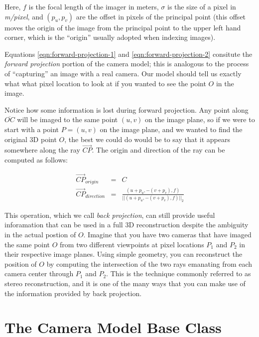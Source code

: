 Here, $f$ is the focal length of the imager in meters, $\sigma$ is the
size of a pixel in {\em m/pixel}, and $(p_u, p_v)$ are the offset in
pixels of the principal point (this offset moves the origin of the
image from the principal point to the upper left hand corner, which is
the ``origin'' usually adopted when indexing images).  

Equations \ref{eqn:forward-projection-1} and
\ref{eqn:forward-projection-2} consitute the {\em forward projection}
portion of the camera model; this is analogous to the process of
``capturing'' an image with a real camera.  Our model should tell us
exactly what what pixel location to look at if you wanted to see the
point $O$ in the image.

Notice how some information is lost during forward projection.  Any
point along $\overline{OC}$ will be imaged to the same point $(u,v)$
on the image plane, so if we were to start with a point $P=(u,v)$ on
the image plane, and we wanted to find the original 3D point $O$, the
best we could do would be to say that it appears somewhere along the
ray $\overrightarrow{CP}$. The
origin and direction of the ray can be computed as follows:

\begin{eqnarray}
\label{eqn:reverse-projection-1}
\overrightarrow{CP}_{origin} & = & C \\
\label{eqn:forward-projection-2}
\overrightarrow{CP}_{direction} & = & \frac{(u + p_u, -(v + p_v), f)} {||(u + p_u, -(v + p_v), f)||_2}
\end{eqnarray}

This operation, which we call {\em back projection}, can still
provide useful inforamation that can be used in a full 3D
reconstruction despite the ambiguity in the actual postion of $O$.
Imagine that you have two cameras that have imaged the same point $O$
from two different viewpoints at pixel locations $P_1$ and $P_2$ in
their respective image planes.  Using simple geometry, you can
reconstruct the position of $O$ by computing the intersection of the
two rays emanating from each camera center through $P_1$ and $P_2$.
This is the technique commonly referred to as stereo reconstruction,
and it is one of the many ways that you can make use of the
information provided by back projection.

\section{The Camera Model Base Class}

